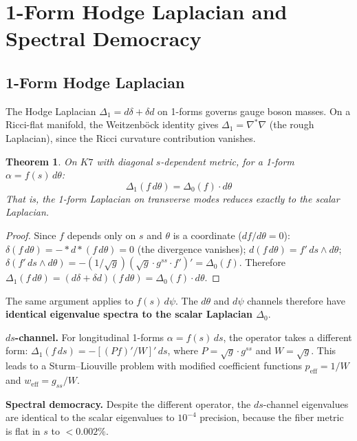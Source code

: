 \documentclass[11pt,a4paper]{article}
\newcommand{\Kseven}{K_7}
\newtheorem{theorem}{Theorem}[section]
\theoremstyle{remark}
\def\Kseven{K7}%
\begin{document}
\section{1-Form Hodge Laplacian and Spectral Democracy}

\subsection{1-Form Hodge Laplacian}

The Hodge Laplacian $\Delta_1 = d\delta + \delta d$ on 1-forms governs gauge boson masses. On a
Ricci-flat manifold, the Weitzenb\"ock identity gives $\Delta_1 = \nabla^*\nabla$ (the rough Laplacian),
since the Ricci curvature contribution vanishes.

\begin{theorem}
On $\Kseven$ with diagonal $s$-dependent metric, for a 1-form $\alpha = f(s)\, d\theta$:
\begin{equation}
\Delta_1(f\, d\theta) = \Delta_0(f) \cdot d\theta
\end{equation}
That is, the 1-form Laplacian on transverse modes reduces exactly to the scalar
Laplacian.
\end{theorem}

\begin{proof}
Since $f$ depends only on $s$ and $\theta$ is a coordinate ($df/d\theta = 0$):
$\delta(f\, d\theta) = -{*}d{*}(f\, d\theta) = 0$ (the divergence vanishes);
$d(f\, d\theta) = f'\, ds \wedge d\theta$;
$\delta(f'\, ds \wedge d\theta) = -(1/\sqrt{g})(\sqrt{g} \cdot g^{ss} \cdot f')' = \Delta_0(f)$.
Therefore $\Delta_1(f\, d\theta) = (d\delta + \delta d)(f\, d\theta) = \Delta_0(f) \cdot d\theta$.
\end{proof}

The same argument applies to $f(s)\, d\psi$. The $d\theta$ and $d\psi$ channels therefore have
\textbf{identical eigenvalue spectra to the scalar Laplacian $\Delta_0$}.

\textbf{$ds$-channel.} For longitudinal 1-forms $\alpha = f(s)\, ds$, the operator takes a
different form: $\Delta_1(f\, ds) = -[(Pf)'/W]'\, ds$, where $P = \sqrt{g} \cdot g^{ss}$ and
$W = \sqrt{g}$. This leads to a Sturm--Liouville problem with modified coefficient
functions $p_{\mathrm{eff}} = 1/W$ and $w_{\mathrm{eff}} = g_{ss}/W$.

\textbf{Spectral democracy.} Despite the different operator, the $ds$-channel eigenvalues
are identical to the scalar eigenvalues to $10^{-4}$ precision, because
the fiber metric is flat in $s$ to $< 0.002\%$.
\end{document}
